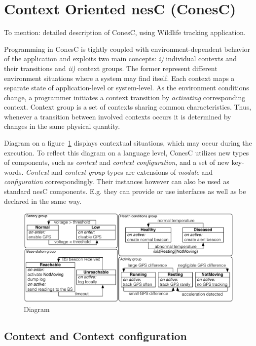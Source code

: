 \section{Context Oriented nesC (ConesC)}
To mention: detailed description of ConesC, using Wildlife tracking application.

Programming in ConesC is tightly coupled with environment-dependent behavior of the application and exploits two main concepts: \emph{i)} individual contexts and their transitions and \emph{ii)} context groups. The former represent different environment situations where a system may find itself. Each context maps a separate state of application-level or system-level. As the environment conditions change, a programmer initiates a context transition by \emph{activating} corresponding context. Context group is a set of contexts sharing common characteristics. Thus, whenever a transition between involved contexts occurs it is determined by changes in the same physical quantity.

Diagram on a figure~\ref{fig:wtd} displays contextual situations, which may occur during the execution. To reflect this diagram on a language level, ConesC utilizes new types of components, such as \emph{context} and \emph{context configuration}, and a set of new key-words. \emph{Context} and \emph{context group} types are extensions of \emph{module} and \emph{configuration} correspondingly. Their instances however can also be used as standard nesC components. E.g. they can provide or use interfaces as well as be declared in the same way.

\begin{figure}[!h]
\centering
\includegraphics[width=\columnwidth]{pdf/wildlifetracking}
\caption{Diagram}
\label{fig:wtd}
\end{figure}

\subsection{Context and Context configuration}

